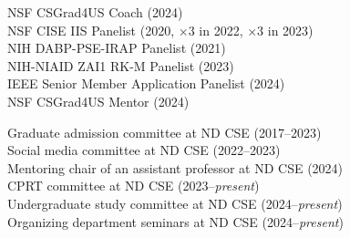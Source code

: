 \documentclass[10pt]{article}
\newenvironment{myindentpar}[1]%
{\begin{list}{}%
         {\setlength{\leftmargin}{#1}}%
         \item[]%
}
{\end{list}}
\newcounter{list}
\begin{document}
\begin{myindentpar}{0.75cm}

\hspace{-0.75cm}{\bf Professional Service}

{\small
\textcolor{white}{} NSF CSGrad4US Coach (2024) \\
\textcolor{white}{} NSF CISE IIS Panelist (2020, $\times 3$ in 2022, $\times 3$ in 2023) \\
\textcolor{white}{} NIH DABP-PSE-IRAP Panelist (2021) \\
\textcolor{white}{} NIH-NIAID ZAI1 RK-M Panelist (2023) \\
\textcolor{white}{} IEEE Senior Member Application Panelist (2024) \\
\textcolor{white}{} NSF CSGrad4US Mentor (2024)
}

\hspace{-0.75cm}{\bf Departmental Service}

{\small

\textcolor{white}{} Graduate admission committee at ND CSE (2017--2023) \\
\textcolor{white}{} Social media committee at ND CSE (2022--2023) \\
\textcolor{white}{} Mentoring chair of an assistant professor at ND CSE (2024) \\
\textcolor{white}{} CPRT committee at ND CSE (2023--\textit{present}) \\
\textcolor{white}{} Undergraduate study committee at ND CSE (2024--\textit{present}) \\
\textcolor{white}{} Organizing department seminars at ND CSE (2024--\textit{present})

}

\hspace{-0.75cm}{\bf Ph.D. Dissertation Committee}

{\small

}
\end{myindentpar}
\end{document}
